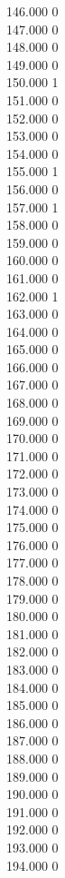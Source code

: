 { 146.000	0 \\
 147.000	0 \\
 148.000	0 \\
 149.000	0 \\
 150.000	1 \\
 151.000	0 \\
 152.000	0 \\
 153.000	0 \\
 154.000	0 \\
 155.000	1 \\
 156.000	0 \\
 157.000	1 \\
 158.000	0 \\
 159.000	0 \\
 160.000	0 \\
 161.000	0 \\
 162.000	1 \\
 163.000	0 \\
 164.000	0 \\
 165.000	0 \\
 166.000	0 \\
 167.000	0 \\
 168.000	0 \\
 169.000	0 \\
 170.000	0 \\
 171.000	0 \\
 172.000	0 \\
 173.000	0 \\
 174.000	0 \\
 175.000	0 \\
 176.000	0 \\
 177.000	0 \\
 178.000	0 \\
 179.000	0 \\
 180.000	0 \\
 181.000	0 \\
 182.000	0 \\
 183.000	0 \\
 184.000	0 \\
 185.000	0 \\
 186.000	0 \\
 187.000	0 \\
 188.000	0 \\
 189.000	0 \\
 190.000	0 \\
 191.000	0 \\
 192.000	0 \\
 193.000	0 \\
 194.000	0 \\
}
